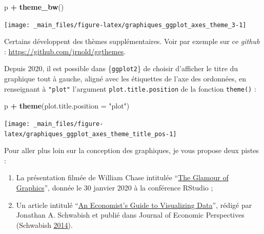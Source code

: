 \documentclass[
  11pt,
]{book}
\newenvironment{Shaded}{\begin{snugshade}}{\end{snugshade}}
\newcommand{\DataTypeTok}[1]{\textcolor[rgb]{0.13,0.29,0.53}{#1}}
\newcommand{\KeywordTok}[1]{\textcolor[rgb]{0.13,0.29,0.53}{\textbf{#1}}}
\newcommand{\NormalTok}[1]{#1}
\newcommand{\OperatorTok}[1]{\textcolor[rgb]{0.81,0.36,0.00}{\textbf{#1}}}
\newcommand{\StringTok}[1]{\textcolor[rgb]{0.31,0.60,0.02}{#1}}
\providecommand{\tightlist}{%
  \setlength{\itemsep}{0pt}\setlength{\parskip}{0pt}}
\numberwithin{equation}{section}
\numberwithin{countremarque}{section}
\begin{document}
\begin{Shaded}
\begin{Highlighting}[]
\NormalTok{p }\OperatorTok{+}\StringTok{ }\KeywordTok{theme\_bw}\NormalTok{()}
\end{Highlighting}
\end{Shaded}

\begin{center}\texttt{[image: \_main\_files/figure-latex/graphiques\_ggplot\_axes\_theme\_3-1]} \end{center}

Certains développent des thèmes supplémentaires. Voir par exemple sur ce \emph{github} : \url{https://github.com/jrnold/ggthemes}.

Depuis 2020, il est possible dans \{\texttt{ggplot2}\} de choisir d'afficher le titre du graphique tout à gauche, aligné avec les étiquettes de l'axe des ordonnées, en renseignant à \texttt{"plot"} l'argument \texttt{plot.title.position} de la fonction \texttt{theme()} :

\begin{Shaded}
\begin{Highlighting}[]
\NormalTok{p }\OperatorTok{+}\StringTok{ }\KeywordTok{theme}\NormalTok{(}\DataTypeTok{plot.title.position =} \StringTok{"plot"}\NormalTok{)}
\end{Highlighting}
\end{Shaded}

\begin{center}\texttt{[image: \_main\_files/figure-latex/graphiques\_ggplot\_axes\_theme\_title\_pos-1]} \end{center}

Pour aller plus loin sur la conception des graphiques, je vous propose deux pistes :

\begin{enumerate}
\def\labelenumi{\arabic{enumi}.}
\tightlist
\item
  La présentation filmée de William Chase intitulée ``\href{https://rstudio.com/resources/rstudioconf-2020/the-glamour-of-graphics/}{The Glamour of Graphics}'', donnée le 30 janvier 2020 à la conférence RStudio ;
\item
  Un article intitulé ``\href{https://www.aeaweb.org/articles?id=10.1257/jep.28.1.209}{An Economist's Guide to Visualizing Data}'', rédigé par Jonathan A. Schwabish et publié dans Journal of Economic Perspectives (Schwabish \protect\hyperlink{ref-schwabish2014economist}{2014}).
\end{enumerate}
\end{document}
